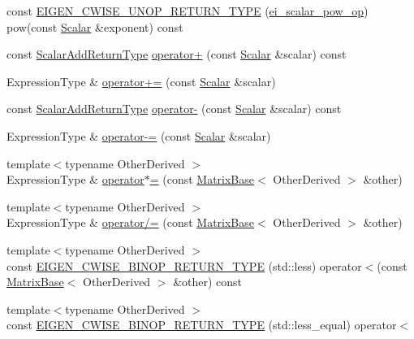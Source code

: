 \begin{DoxyCompactItemize}
\item 
const \hyperlink{class_cwise_a39e487fae1ba3ca70536eaa2c2ac30fe}{E\-I\-G\-E\-N\-\_\-\-C\-W\-I\-S\-E\-\_\-\-U\-N\-O\-P\-\_\-\-R\-E\-T\-U\-R\-N\-\_\-\-T\-Y\-P\-E} (\hyperlink{structei__scalar__pow__op}{ei\-\_\-scalar\-\_\-pow\-\_\-op}) pow(const \hyperlink{class_cwise_aaa88a1b7a680bc160011b24e948bcaaf}{Scalar} \&exponent) const 
\item 
const \hyperlink{class_cwise_a89225bb17b5d6bfc9e4834590f38d61f}{Scalar\-Add\-Return\-Type} \hyperlink{class_cwise_ae5e3504845a9cd9462b0099b11163dc3}{operator+} (const \hyperlink{class_cwise_aaa88a1b7a680bc160011b24e948bcaaf}{Scalar} \&scalar) const 
\item 
Expression\-Type \& \hyperlink{class_cwise_a8f88c73bacd5462dcc517ae322214b6c}{operator+=} (const \hyperlink{class_cwise_aaa88a1b7a680bc160011b24e948bcaaf}{Scalar} \&scalar)
\item 
const \hyperlink{class_cwise_a89225bb17b5d6bfc9e4834590f38d61f}{Scalar\-Add\-Return\-Type} \hyperlink{class_cwise_a819c87b070916ebd2e947a7779910ec0}{operator-\/} (const \hyperlink{class_cwise_aaa88a1b7a680bc160011b24e948bcaaf}{Scalar} \&scalar) const 
\item 
Expression\-Type \& \hyperlink{class_cwise_ada95487760fa51a034d0edaae851a14a}{operator-\/=} (const \hyperlink{class_cwise_aaa88a1b7a680bc160011b24e948bcaaf}{Scalar} \&scalar)
\item 
{\footnotesize template$<$typename Other\-Derived $>$ }\\Expression\-Type \& \hyperlink{class_cwise_a8e1e129e18537070472ab9ec8dc92cbf}{operator$\ast$=} (const \hyperlink{class_matrix_base}{Matrix\-Base}$<$ Other\-Derived $>$ \&other)
\item 
{\footnotesize template$<$typename Other\-Derived $>$ }\\Expression\-Type \& \hyperlink{class_cwise_a2569d99116db8fcd4a4f76315dc1e6bd}{operator/=} (const \hyperlink{class_matrix_base}{Matrix\-Base}$<$ Other\-Derived $>$ \&other)
\item 
{\footnotesize template$<$typename Other\-Derived $>$ }\\const \hyperlink{class_cwise_af67307015a64dd53f8c66004ddb24860}{E\-I\-G\-E\-N\-\_\-\-C\-W\-I\-S\-E\-\_\-\-B\-I\-N\-O\-P\-\_\-\-R\-E\-T\-U\-R\-N\-\_\-\-T\-Y\-P\-E} (std\-::less) operator$<$(const \hyperlink{class_matrix_base}{Matrix\-Base}$<$ Other\-Derived $>$ \&other) const 
\item 
{\footnotesize template$<$typename Other\-Derived $>$ }\\const \hyperlink{class_cwise_a483dd8e3c17c809ca827be2103f8f8fc}{E\-I\-G\-E\-N\-\_\-\-C\-W\-I\-S\-E\-\_\-\-B\-I\-N\-O\-P\-\_\-\-R\-E\-T\-U\-R\-N\-\_\-\-T\-Y\-P\-E} (std\-::less\-\_\-equal) operator$<$

\end{DoxyCompactItemize}
